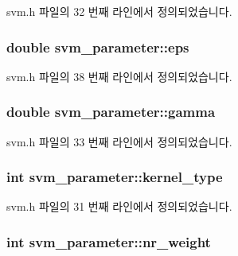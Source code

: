 svm.\+h 파일의 32 번째 라인에서 정의되었습니다.

\hypertarget{structsvm__parameter_a1feab5a4e0d5842a20e544f3f944f841}{
\subsubsection[{eps}]{\setlength{\rightskip}{0pt plus 5cm}double svm\+\_\+parameter\+::eps}}\label{structsvm__parameter_a1feab5a4e0d5842a20e544f3f944f841}


svm.\+h 파일의 38 번째 라인에서 정의되었습니다.

\hypertarget{structsvm__parameter_a91667b90506e171482b5fc619377110d}{
\subsubsection[{gamma}]{\setlength{\rightskip}{0pt plus 5cm}double svm\+\_\+parameter\+::gamma}}\label{structsvm__parameter_a91667b90506e171482b5fc619377110d}


svm.\+h 파일의 33 번째 라인에서 정의되었습니다.

\hypertarget{structsvm__parameter_a4188713ba31fc3d101244a6bcc09a760}{
\subsubsection[{kernel\+\_\+type}]{\setlength{\rightskip}{0pt plus 5cm}int svm\+\_\+parameter\+::kernel\+\_\+type}}\label{structsvm__parameter_a4188713ba31fc3d101244a6bcc09a760}


svm.\+h 파일의 31 번째 라인에서 정의되었습니다.

\hypertarget{structsvm__parameter_a44014738d1db5444f7f9a1ebf74e4214}{
\subsubsection[{nr\+\_\+weight}]{\setlength{\rightskip}{0pt plus 5cm}int svm\+\_\+parameter\+::nr\+\_\+weight}}\label{structsvm__parameter_a44014738d1db5444f7f9a1ebf74e4214}


